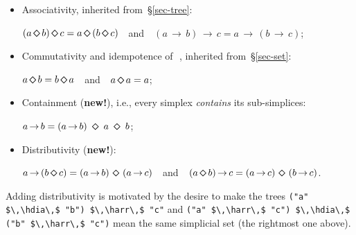 \documentclass[crc,english]{programming}
\newcommand{\code}[1]{\lstinline[mathescape]|#1|}
\newcommand{\hdia}{\,\text{\raisebox{-0.2mm}{\Large\color{darkblue} $\diamond$}}\,}
\newcommand{\harr}{\,\text{\color{darkblue} $\rightarrow$}\,}
\newcommand{\dia}{\,\text{\raisebox{-0.3mm}{\Large $\diamond$}}\,}
\newcommand{\arr}{\,\text{$\rightarrow$}\,}
\begin{document}
\vspace{-1mm}\begin{itemize}
    \item Associativity, inherited from~\S\ref{sec-tree}:

          \vspace{0.5mm}\hspace{10mm}$(a \dia b) \dia c = a \dia (b \dia c)$~~and~~$(a \arr b) \arr c = a \arr (b \arr c)$;

    \item Commutativity and idempotence of \dia, inherited from~\S\ref{sec-set}:

          \vspace{0.5mm}\hspace{10mm}$a \dia b = b \dia a$~~and~~$a \dia a = a$;

    \item Containment (\textbf{\color{darkblue}new!}), i.e., every simplex
          \emph{contains} its sub-simplices:

          \vspace{0.5mm}\hspace{10mm}$a \arr b = (a \arr b)\ \dia\ a\ \dia\ b$;

    \item Distributivity (\textbf{\color{darkblue}new!}):

          \vspace{0.5mm}\hspace{10mm}$a \arr (b \dia c) = (a \arr b)\,\dia\,(a \arr c)$~~and~~$(a \dia b) \arr c = (a \arr c)\,\dia\,(b \arr c)$.
\end{itemize}

\noindent
Adding distributivity is motivated by the desire to make the trees
\code{("a" $\,\hdia\,$ "b") $\,\harr\,$ "c"} and
\code{("a" $\,\harr\,$ "c") $\,\hdia\,$ ("b" $\,\harr\,$ "c")} mean the same
simplicial set (the rightmost one above).
\end{document}

